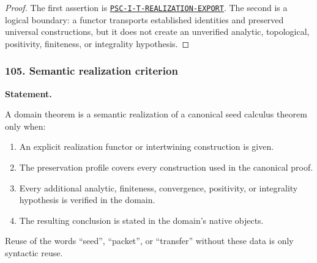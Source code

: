 \begin{proof}
The first assertion is \hyperref[rec:PSC-I-T-REALIZATION-EXPORT]{\nolinkurl{PSC-I-T-REALIZATION-EXPORT}}.  The second is a logical boundary: a functor transports established identities and preserved universal constructions, but it does not create an unverified analytic, topological, positivity, finiteness, or integrality hypothesis.
\end{proof}
\subsubsection*{105. Semantic realization criterion}
\label{rec:PSC-I-D-SEMANTIC-REALIZATION}
\textbf{Statement.}\par
A domain theorem is a semantic realization of a canonical seed calculus theorem only when:
\begin{enumerate}[label=(\roman*)]
\item An explicit realization functor or intertwining construction is given.
\item The preservation profile covers every construction used in the canonical proof.
\item Every additional analytic, finiteness, convergence, positivity, or integrality hypothesis is verified in the domain.
\item The resulting conclusion is stated in the domain's native objects.
\end{enumerate}
Reuse of the words ``seed'', ``packet'', or ``transfer'' without these data is only syntactic reuse.
